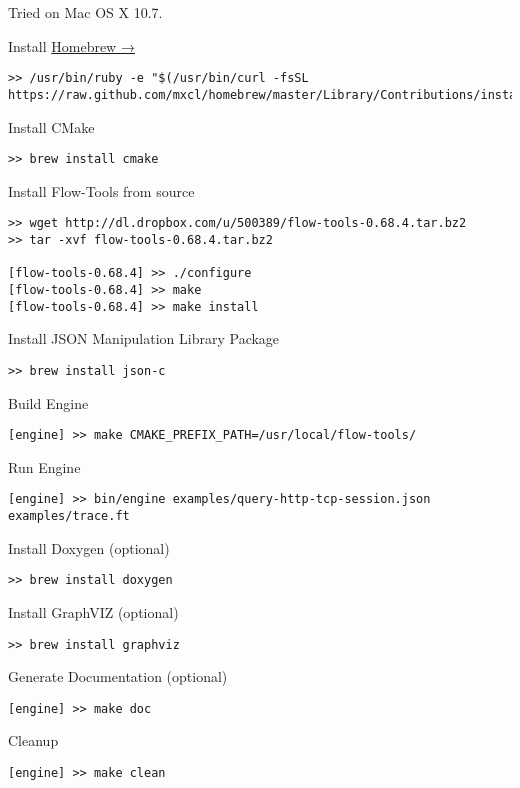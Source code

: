 Tried on Mac OS X 10.7.

Install \href{http://mxcl.github.com/homebrew/}{Homebrew →}

\begin{lstlisting}
>> /usr/bin/ruby -e "$(/usr/bin/curl -fsSL https://raw.github.com/mxcl/homebrew/master/Library/Contributions/install_homebrew.rb)"
\end{lstlisting}

Install CMake

\begin{lstlisting}
>> brew install cmake
\end{lstlisting}

Install Flow-Tools from source

\begin{lstlisting}
>> wget http://dl.dropbox.com/u/500389/flow-tools-0.68.4.tar.bz2
>> tar -xvf flow-tools-0.68.4.tar.bz2

[flow-tools-0.68.4] >> ./configure
[flow-tools-0.68.4] >> make 
[flow-tools-0.68.4] >> make install 
\end{lstlisting}

Install JSON Manipulation Library Package

\begin{lstlisting}
>> brew install json-c
\end{lstlisting}

Build Engine

\begin{lstlisting}
[engine] >> make CMAKE_PREFIX_PATH=/usr/local/flow-tools/
\end{lstlisting}

Run Engine

\begin{lstlisting}
[engine] >> bin/engine examples/query-http-tcp-session.json examples/trace.ft
\end{lstlisting}

Install Doxygen (optional)

\begin{lstlisting}
>> brew install doxygen
\end{lstlisting}

Install GraphVIZ (optional)

\begin{lstlisting}
>> brew install graphviz
\end{lstlisting}

Generate Documentation (optional)

\begin{lstlisting}
[engine] >> make doc    
\end{lstlisting}

Cleanup

\begin{lstlisting}
[engine] >> make clean
\end{lstlisting}

